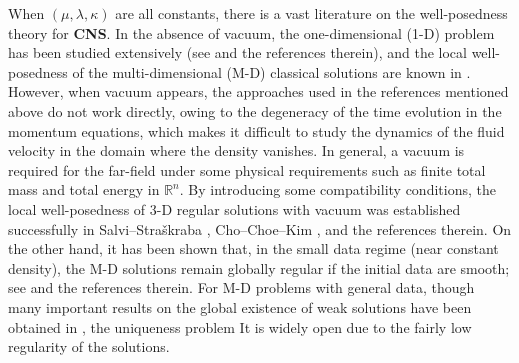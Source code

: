 \documentclass[11pt,reqno]{amsart}
\numberwithin{rk}{section}
\numberwithin{prop}{section}
\numberwithin{mydef}{section}
\numberwithin{lem}{section}
\numberwithin{equation}{section}
\numberwithin{thm}{section}
\begin{document}
When $(\mu, \lambda,\kappa)$  are all constants, there is a vast literature on the well-posedness theory for  \textbf{CNS}. In the absence of vacuum, the one-dimensional (1-D) problem   has been studied extensively (see \cite{Kanel, KN,KS, ZA1} and the references therein), and   the  local well-posedness  of the multi-dimensional (M-D) classical solutions  are known in \cite{nash, serrin}. 
However,   when vacuum appears,  the approaches used in the references  mentioned above do not work directly, owing to the degeneracy of the time evolution in the momentum equations, which makes it difficult to study the dynamics of the fluid velocity in the domain where the density vanishes. 
In general, a vacuum is required for the far-field 
under some physical requirements
such as finite total mass and total energy in  $\mathbb{R}^n$. 
By introducing some  compatibility conditions, the local well-posedness of  3-D regular solutions with vacuum was established successfully 
in Salvi--Stra\v skraba \cite{Salvi},  Cho--Choe--Kim  \cite{CK3},  and the references therein. 
On the other hand,  it  has been shown that,  in the small data regime (near constant density),  the M-D solutions  remain globally regular if the initial data are smooth; see \cite{danchin1,  MN} and the references therein.
For  M-D problems with general data, though many important results on the global existence of weak solutions have been obtained in \cite{BJ,fu3,H,HJ,JZ,lions}, the uniqueness problem  
It is widely open due to the fairly low regularity of the solutions.
\end{document}
